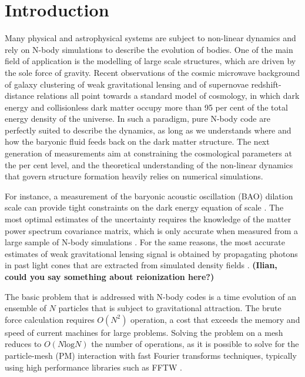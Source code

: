 \section{Introduction}

Many physical and astrophysical systems are subject to non-linear dynamics
and rely on N-body simulations to describe the evolution of bodies. 
One of the main field of application is the modelling of large scale structures, 
which are driven by the sole force of gravity. Recent observations of the cosmic microwave background
\citep{WMAP5-7} of galaxy clustering \citep{2df, SDSS, WiggleZ, BOSS} of weak gravitational lensing \citep{CFHTLS, SDSS}
and of supernovae redshift-distance relations all point towards a standard model of cosmology, in which dark energy
and collisionless dark matter occupy more than 95 per cent of the total energy density of the universe.
In such a paradigm, pure N-body code are perfectly suited to describe the dynamics, as long as we
understands where and how the baryonic fluid feeds back on the dark matter structure.
The next generation of measurements aim at constraining the cosmological parameters at the per cent level, 
and the theoretical understanding of the non-linear dynamics that govern structure formation heavily relies 
on numerical simulations. 

For instance, a measurement of the baryonic acoustic oscillation (BAO) dilation scale can provide
tight constraints on the dark energy equation of scale \citep{Seo2003,2005}.
The most optimal estimates of the uncertainty requires the knowledge of the 
matter power spectrum covariance matrix, which is only accurate when measured from a large sample 
of N-body simulations \citep{RH2005, japan2,japan3, Ngan}.
For the same reasons, the most accurate estimates of weak gravitational lensing signal is obtained
by propagating photons in past light cones that are extracted from simulated density fields \citep{HarnoisLudo, Takahashi }.
{\bf (Ilian, could you say something about reionization here?)}

The basic problem that is addressed with N-body codes is a time evolution of an ensemble of $N$ particles
that is subject to gravitational attraction. The brute force calculation requires $O(N^{2})$ operation, a cost that 
exceeds the memory and speed of current machines for large problems.
Solving the problem  on a mesh \citep{Hockney} reduces to $O(N\mbox{log}N)$ the number of operations,
as it is possible to solve for the particle-mesh (PM) interaction with fast Fourier transforms techniques, 
typically using high performance libraries such as {\small FFTW} \citep{FFTW}.


